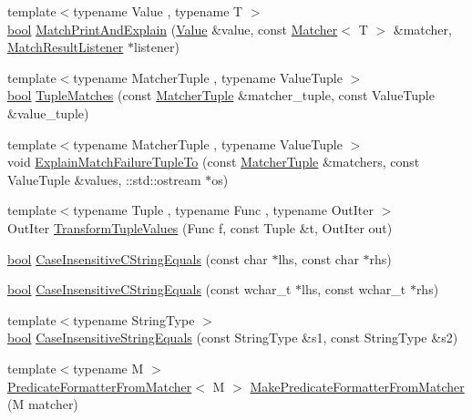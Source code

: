 \begin{DoxyCompactItemize}
\item 
{\footnotesize template$<$typename Value , typename T $>$ }\\\hyperlink{classbool}{bool} \hyperlink{namespacetesting_1_1internal_a0821df2611d54c79bac990719ad8a2dd}{Match\+Print\+And\+Explain} (\hyperlink{namespacetesting_ae44c50a3a7f0a46f05c8a0b0592b4a62}{Value} \&value, const \hyperlink{classtesting_1_1Matcher}{Matcher}$<$ T $>$ \&matcher, \hyperlink{classtesting_1_1MatchResultListener}{Match\+Result\+Listener} $\ast$listener)
\item 
{\footnotesize template$<$typename Matcher\+Tuple , typename Value\+Tuple $>$ }\\\hyperlink{classbool}{bool} \hyperlink{namespacetesting_1_1internal_a10095d1e1c99369200072b39d657ebc4}{Tuple\+Matches} (const \hyperlink{structtesting_1_1internal_1_1MatcherTuple}{Matcher\+Tuple} \&matcher\+\_\+tuple, const Value\+Tuple \&value\+\_\+tuple)
\item 
{\footnotesize template$<$typename Matcher\+Tuple , typename Value\+Tuple $>$ }\\void \hyperlink{namespacetesting_1_1internal_afd62fd8914a7fae1bfc8a314fcc81f22}{Explain\+Match\+Failure\+Tuple\+To} (const \hyperlink{structtesting_1_1internal_1_1MatcherTuple}{Matcher\+Tuple} \&matchers, const Value\+Tuple \&values, \+::std\+::ostream $\ast$os)
\item 
{\footnotesize template$<$typename Tuple , typename Func , typename Out\+Iter $>$ }\\Out\+Iter \hyperlink{namespacetesting_1_1internal_a07ba091a64aa2ba95e41accc55dc8855}{Transform\+Tuple\+Values} (Func f, const Tuple \&t, Out\+Iter out)
\item 
\hyperlink{classbool}{bool} \hyperlink{namespacetesting_1_1internal_aebfd0cd34de52d7973a5b2d03ba848cf}{Case\+Insensitive\+C\+String\+Equals} (const char $\ast$lhs, const char $\ast$rhs)
\item 
\hyperlink{classbool}{bool} \hyperlink{namespacetesting_1_1internal_ad5b31f61a3cc5b4226d3560f5b48f4dd}{Case\+Insensitive\+C\+String\+Equals} (const wchar\+\_\+t $\ast$lhs, const wchar\+\_\+t $\ast$rhs)
\item 
{\footnotesize template$<$typename String\+Type $>$ }\\\hyperlink{classbool}{bool} \hyperlink{namespacetesting_1_1internal_a383de24b1cca6648c14b03964c0ed843}{Case\+Insensitive\+String\+Equals} (const String\+Type \&s1, const String\+Type \&s2)
\item 
{\footnotesize template$<$typename M $>$ }\\\hyperlink{classtesting_1_1internal_1_1PredicateFormatterFromMatcher}{Predicate\+Formatter\+From\+Matcher}$<$ M $>$ \hyperlink{namespacetesting_1_1internal_a3fd0f30ec03d577bba3e1aa13241e17d}{Make\+Predicate\+Formatter\+From\+Matcher} (M matcher)

\end{DoxyCompactItemize}
